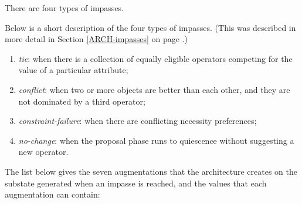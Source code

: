 There are four types of impasses. 

Below is a short description of the four types of impasses. (This was
described in more detail in Section \ref{ARCH-impasses} on page
\pageref{ARCH-impasses}.)

\vspace{-12pt}
\begin{enumerate}
\item \emph{tie}: when there is a collection of equally eligible operators
        competing for the value of a particular attribute;\vspace{-8pt}
\item \emph{conflict}: when two or more objects are better than each other,
        and they are not dominated by a third operator;\vspace{-8pt}
\item \emph{constraint-failure}: when there are conflicting necessity
        preferences; \vspace{-8pt}
\item \emph{no-change}: when the proposal phase runs to quiescence without 
        suggesting a new operator.
\end{enumerate}

The list below gives the seven augmentations that the architecture creates on the
substate generated when an impasse is reached, and the
values that each augmentation can contain:

